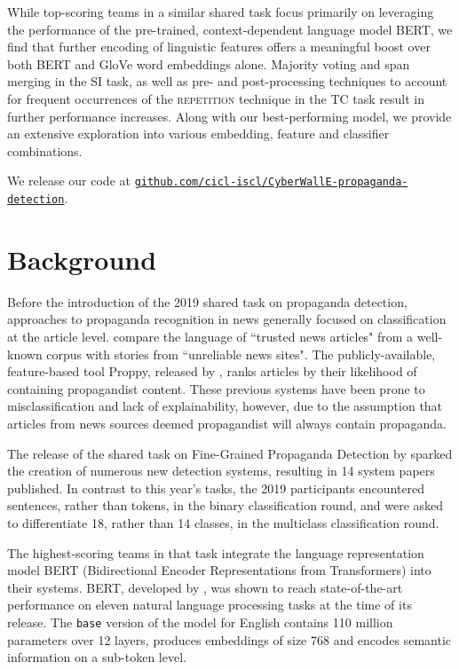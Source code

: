 \documentclass[11pt]{article}
\begin{document}
While top-scoring teams in a similar shared task \cite{EMNLP19DaSanMartino}  focus primarily on leveraging the performance of the pre-trained, context-dependent language model BERT, we find that further encoding of linguistic features offers a meaningful boost over both BERT and GloVe word embeddings alone.
Majority voting and span merging in the SI task, as well as pre- and post-processing techniques to account for frequent occurrences of the \textsc{repetition} technique in the TC task result in further performance increases.
Along with our best-performing model, we provide an extensive exploration into various embedding, feature and classifier combinations. 


We release our code at \href{https://github.com/cicl-iscl/CyberWallE-propaganda-detection}{\texttt{github.com/cicl-iscl/CyberWallE-propaganda-detection}}.

\section{Background}

Before the introduction of the 2019 shared task on propaganda detection, approaches to propaganda recognition in news generally focused on classification at the article level.
 compare the language of ``trusted news articles" from a well-known corpus with stories from ``unreliable news sites". The publicly-available, feature-based tool Proppy, released by , ranks articles by their likelihood of containing propagandist content. These previous systems have been prone to misclassification and lack of explainability, however, due to the assumption that articles from news sources deemed propagandist will always contain propaganda.

The release of the shared task on Fine-Grained
Propaganda Detection by  sparked the creation of numerous new detection systems, resulting in 14 system papers published. In contrast to this year's tasks, the 2019 participants encountered sentences, rather than tokens, in the binary classification round, and were asked to differentiate 18, rather than 14 classes, in the multiclass classification round. 

The highest-scoring teams in that task integrate the language representation model BERT (Bidirectional Encoder Representations from Transformers) into their systems.
BERT, developed by , was shown to reach state-of-the-art performance on eleven natural language processing tasks at the time of its release. 
The \texttt{base} version of the model for English contains 110 million parameters over 12 layers, produces embeddings of size 768 and encodes semantic information on a sub-token level. 
\end{document}
